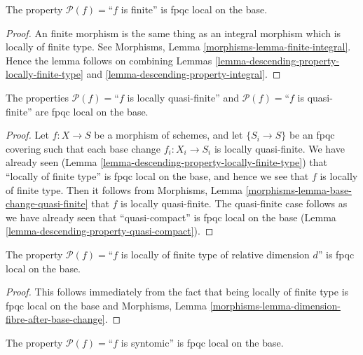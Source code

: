 \begin{lemma}
\label{lemma-descending-property-finite}
The property $\mathcal{P}(f) =$``$f$ is finite''
is fpqc local on the base.
\end{lemma}

\begin{proof}
An finite morphism is the same thing as an integral
morphism which is locally of finite type. See
Morphisms, Lemma \ref{morphisms-lemma-finite-integral}.
Hence the lemma follows on combining
Lemmas \ref{lemma-descending-property-locally-finite-type}
and \ref{lemma-descending-property-integral}.
\end{proof}

\begin{lemma}
\label{lemma-descending-property-quasi-finite}
The properties
$\mathcal{P}(f) =$``$f$ is locally quasi-finite''
and
$\mathcal{P}(f) =$``$f$ is quasi-finite''
are fpqc local on the base.
\end{lemma}

\begin{proof}
Let $f : X \to S$ be a morphism of schemes, and let $\{S_i \to S\}$
be an fpqc covering such that each base change
$f_i : X_i \to S_i$ is locally quasi-finite.
We have already seen
(Lemma \ref{lemma-descending-property-locally-finite-type})
that ``locally of finite type'' is fpqc local
on the base, and hence we see that $f$ is locally of finite type.
Then it follows from
Morphisms, Lemma \ref{morphisms-lemma-base-change-quasi-finite}
that $f$ is locally quasi-finite. The quasi-finite case follows
as we have already seen that ``quasi-compact'' is fpqc local on the base
(Lemma \ref{lemma-descending-property-quasi-compact}).
\end{proof}

\begin{lemma}
\label{lemma-descending-property-relative-dimension-d}
The property $\mathcal{P}(f) =$``$f$ is locally of finite type
of relative dimension $d$'' is fpqc local on the base.
\end{lemma}

\begin{proof}
This follows immediately from the fact that being locally of finite
type is fpqc local on the base and
Morphisms, Lemma \ref{morphisms-lemma-dimension-fibre-after-base-change}.
\end{proof}

\begin{lemma}
\label{lemma-descending-property-syntomic}
The property $\mathcal{P}(f) =$``$f$ is syntomic''
is fpqc local on the base.
\end{lemma}

